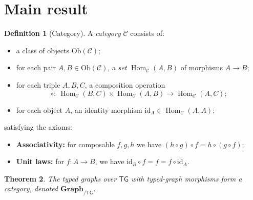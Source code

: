 \documentclass[11pt]{article}
\newtheorem{theorem}{Theorem}[section]
\theoremstyle{definition}
\newtheorem{definition}[theorem]{Definition}
\newcommand{\cat}[1]{\mathbf{#1}}
\newcommand{\Graph}{\cat{Graph}}
\newcommand{\Hom}{\operatorname{Hom}}
\newcommand{\id}{\mathrm{id}}
\begin{document}
\section{Main result}

\begin{definition}[Category]\label{def:category}
A \emph{category} $\mathcal{C}$ consists of:
\begin{itemize}[nosep]
  \item a class of objects $\mathrm{Ob}(\mathcal{C})$;
  \item for each pair $A,B\in\mathrm{Ob}(\mathcal{C})$, a \emph{set} $\Hom_{\mathcal{C}}(A,B)$ of morphisms $A\to B$;
  \item for each triple $A,B,C$, a composition operation
  \[
    \circ:\ \Hom_{\mathcal{C}}(B,C)\times\Hom_{\mathcal{C}}(A,B)\to \Hom_{\mathcal{C}}(A,C);
  \]
  \item for each object $A$, an identity morphism $\id_A\in\Hom_{\mathcal{C}}(A,A)$;
\end{itemize}
satisfying the axioms:
\begin{itemize}[nosep]
  \item \textbf{Associativity:} for composable $f,g,h$ we have $(h\circ g)\circ f=h\circ(g\circ f)$;
  \item \textbf{Unit laws:} for $f:A\to B$, we have $\id_B\circ f=f=f\circ\id_A$.
\end{itemize}
\end{definition}

\begin{theorem}\label{thm:is-category}
The typed graphs over $\mathsf{TG}$ with typed-graph morphisms form a category,
denoted $\Graph_{/\mathsf{TG}}$.
\end{theorem}
\end{document}
